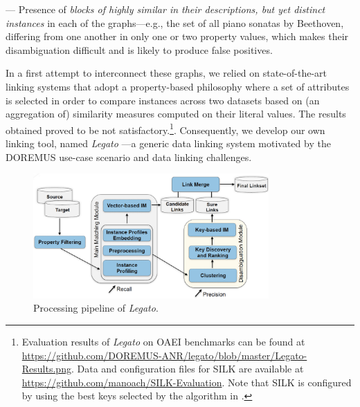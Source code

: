 --- Presence of {\it blocks of  highly similar in their descriptions, but yet distinct instances} in each of the graphs---e.g., the set of all piano sonatas by Beethoven, differing from one another in only one or two property values, which makes their disambiguation difficult and is likely to produce false positives. 

In a first attempt to interconnect these graphs, we relied on state-of-the-art linking systems \cite{jentzsch2010silk,ngomo2011limes} that adopt a property-based philosophy where a set of attributes is selected in order to compare instances across two datasets based on (an aggregation of) similarity measures computed on their literal values. The results obtained proved to be not satisfactory.\footnote{Evaluation results of {\it Legato} on OAEI benchmarks can be found at \url{https://github.com/DOREMUS-ANR/legato/blob/master/Legato-Results.png}. Data and configuration files for SILK are available at \url{https://github.com/manoach/SILK-Evaluation}. Note that SILK is configured by using the best keys selected by the algorithm in \cite{achichiEST16}.}. Consequently, we develop our own linking tool, named \textit{Legato} \cite{achichi2017legato}---a generic data linking system motivated by the DOREMUS use-case scenario and data linking challenges. 

\begin{figure} 
\center
	\includegraphics[width=9cm]{img/legato-wf-3.png}
	\caption{Processing pipeline of \textit{Legato}.}
	\label{fig:workflow}
\end{figure}

